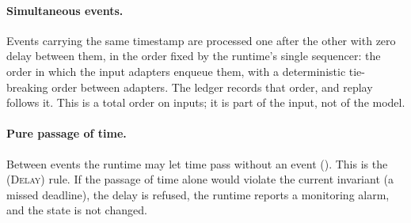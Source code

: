 \paragraph{Simultaneous events.}
Events carrying the same timestamp are processed one after the other with zero
delay between them, in the order fixed by the runtime's single sequencer: the
order in which the input adapters enqueue them, with a deterministic
tie-breaking order between adapters. The ledger records that order, and replay
follows it. This is a total order on inputs; it is part of the input, not of
the model.

\paragraph{Pure passage of time.}
Between events the runtime may let time pass without an event
(). This is the \textsc{(Delay)} rule. If the passage of time
alone would violate the current invariant (a missed deadline), the delay is
refused, the runtime reports a monitoring alarm, and the state is not changed.
